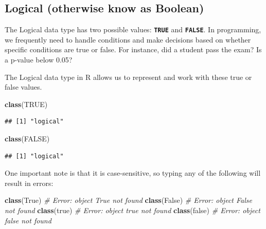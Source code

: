 \documentclass[
]{book}
\newenvironment{Shaded}{\begin{snugshade}}{\end{snugshade}}
\newcommand{\CommentTok}[1]{\textcolor[rgb]{0.56,0.35,0.01}{\textit{#1}}}
\newcommand{\ConstantTok}[1]{\textcolor[rgb]{0.56,0.35,0.01}{#1}}
\newcommand{\FunctionTok}[1]{\textcolor[rgb]{0.13,0.29,0.53}{\textbf{#1}}}
\newcommand{\NormalTok}[1]{#1}
\begin{document}
\hypertarget{logical-otherwise-know-as-boolean}{%
\subsection{Logical (otherwise know as Boolean)}\label{logical-otherwise-know-as-boolean}}

The Logical data type has two possible values: \textbf{\texttt{TRUE}} and \textbf{\texttt{FALSE}}. In programming, we frequently need to handle conditions and make decisions based on whether specific conditions are true or false. For instance, did a student pass the exam? Is a p-value below 0.05?

The Logical data type in R allows us to represent and work with these true or false values.

\begin{Shaded}
\begin{Highlighting}[]
\FunctionTok{class}\NormalTok{(}\ConstantTok{TRUE}\NormalTok{)}
\end{Highlighting}
\end{Shaded}

\begin{verbatim}
## [1] "logical"
\end{verbatim}

\begin{Shaded}
\begin{Highlighting}[]
\FunctionTok{class}\NormalTok{(}\ConstantTok{FALSE}\NormalTok{)}
\end{Highlighting}
\end{Shaded}

\begin{verbatim}
## [1] "logical"
\end{verbatim}

One important note is that it is case-sensitive, so typing any of the following will result in errors:

\begin{Shaded}
\begin{Highlighting}[]
\FunctionTok{class}\NormalTok{(True)   }\CommentTok{\# Error: object \textquotesingle{}True\textquotesingle{} not found}
\FunctionTok{class}\NormalTok{(False)  }\CommentTok{\# Error: object \textquotesingle{}False\textquotesingle{} not found}
\FunctionTok{class}\NormalTok{(true)   }\CommentTok{\# Error: object \textquotesingle{}true\textquotesingle{} not found}
\FunctionTok{class}\NormalTok{(false)  }\CommentTok{\# Error: object \textquotesingle{}false\textquotesingle{} not found}
\end{Highlighting}
\end{Shaded}
\end{document}
